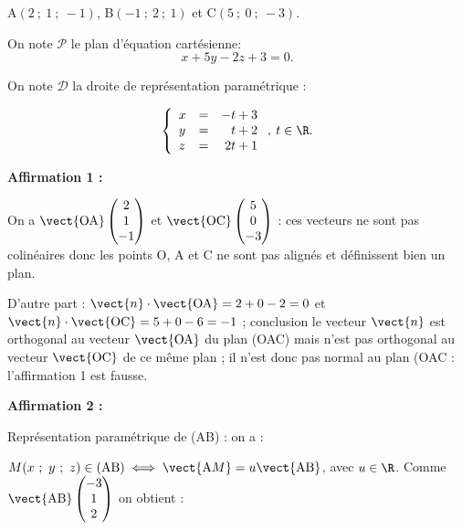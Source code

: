 \medskip










\begin{center}A$(2~;~1~;~-1)$, \quad B$(-1~;~2~;~1)$ et \quad C$(5~;~0~;~-3)$.\end{center}

On note $\mathcal{P}$ le plan d'équation cartésienne:
\[x + 5y - 2z + 3 = 0.\]

On note $\mathcal{D}$ la droite de représentation paramétrique :

\[\left\{\begin{array}{l c r}
x&=&-t +3\\
y&=&t+ 2\\
z &=& 2t +1
\end{array}\right., \: t \in \R.\]

\medskip

\textbf{Affirmation 1 :}


On a $\vect{\text{OA}}\begin{pmatrix}2\\1\\-1\end{pmatrix}$ et $\vect{\text{OC}}\begin{pmatrix}5\\0\\-3\end{pmatrix}$ : ces vecteurs ne sont pas colinéaires donc les points O, A et C ne sont pas alignés et définissent bien un plan.

D'autre part : $\vect{n} \cdot \vect{\text{OA}} = 2 + 0 - 2 = 0$ et $\vect{n} \cdot \vect{\text{OC}} = 5 + 0 - 6 = - 1$ ; conclusion le vecteur $\vect{n}$ est orthogonal au vecteur $\vect{\text{OA}}$ du plan (OAC) mais n'est pas orthogonal au vecteur $\vect{\text{OC}}$ de ce même plan ; il n'est donc pas normal au plan (OAC : l'affirmation 1 est fausse.
\medskip

\textbf{Affirmation 2 :}



Représentation paramétrique de (AB) : on a :

$M(x~;~y~;~z) \in (\text{AB}) \iff \vect{\text{A}M} = u\vect{\text{AB}}$, avec $u \in \R$.
Comme $\vect{\text{AB}}\begin{pmatrix}-3\\1\\2\end{pmatrix}$ on obtient :

